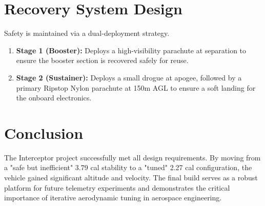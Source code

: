\documentclass[11pt,a4paper]{article}
\begin{document}
\section{Recovery System Design}
Safety is maintained via a dual-deployment strategy.
\begin{enumerate}
    \item \textbf{Stage 1 (Booster):} Deploys a high-visibility parachute at separation to ensure the booster section is recovered safely for reuse.
    \item \textbf{Stage 2 (Sustainer):} Deploys a small drogue at apogee, followed by a primary Ripstop Nylon parachute at 150m AGL to ensure a soft landing for the onboard electronics.
\end{enumerate}

\section{Conclusion}
The Interceptor project successfully met all design requirements. By moving from a "safe but inefficient" 3.79 cal stability to a "tuned" 2.27 cal configuration, the vehicle gained significant altitude and velocity. The final build serves as a robust platform for future telemetry experiments and demonstrates the critical importance of iterative aerodynamic tuning in aerospace engineering.
\end{document}

